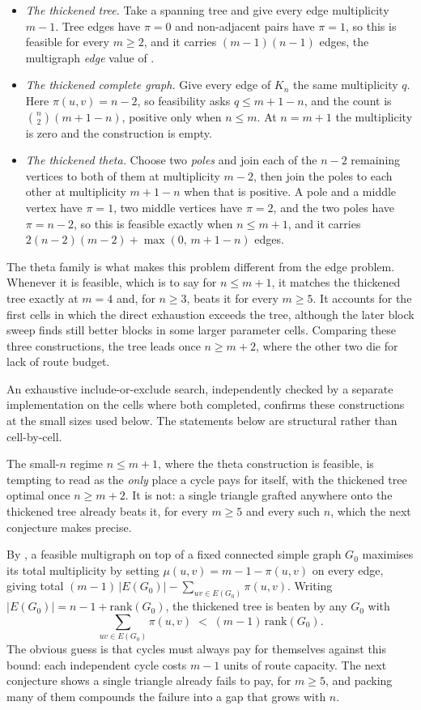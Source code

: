 \begin{itemize}
    \item \emph{The thickened tree.} Take a spanning tree and give every edge multiplicity $m-1$. Tree edges have $\pi = 0$ and non-adjacent pairs have $\pi = 1$, so this is feasible for every $m \ge 2$, and it carries $(m-1)(n-1)$ edges, the multigraph \emph{edge} value of .
    \item \emph{The thickened complete graph.} Give every edge of $K_n$ the same multiplicity $q$. Here $\pi(u,v) = n-2$, so feasibility asks $q \le m+1-n$, and the count is $\binom{n}{2}(m+1-n)$, positive only when $n \le m$. At $n=m+1$ the multiplicity is zero and the construction is empty.
    \item \emph{The thickened theta.} Choose two \emph{poles} and join each of the $n-2$ remaining vertices to both of them at multiplicity $m-2$, then join the poles to each other at multiplicity $m+1-n$ when that is positive. A pole and a middle vertex have $\pi = 1$, two middle vertices have $\pi = 2$, and the two poles have $\pi = n-2$, so this is feasible exactly when $n \le m+1$, and it carries $2(n-2)(m-2) + \max(0,\, m+1-n)$ edges.
\end{itemize}

The theta family is what makes this problem different from the edge problem. Whenever it is feasible, which is to say for $n \le m+1$, it matches the thickened tree exactly at $m = 4$ and, for $n\ge3$, beats it for every $m \ge 5$. It accounts for the first cells in which the direct exhaustion exceeds the tree, although the later block sweep finds still better blocks in some larger parameter cells. Comparing these three constructions, the tree leads once $n \ge m+2$, where the other two die for lack of route budget.

An exhaustive include-or-exclude search, independently checked by a separate
implementation on the cells where both completed, confirms these constructions
at the small sizes used below. The statements below are structural rather than
cell-by-cell.

The small-$n$ regime $n \le m+1$, where the theta construction is feasible, is tempting to read as the \emph{only} place a cycle pays for itself, with the thickened tree optimal once $n \ge m+2$. It is not: a single triangle grafted anywhere onto the thickened tree already beats it, for every $m \ge 5$ and every such $n$, which the next conjecture makes precise.

By , a feasible multigraph on top of a fixed connected simple graph $G_0$ maximises its total multiplicity by setting $\mu(u,v) = m-1-\pi(u,v)$ on every edge, giving total $(m-1)\,|E(G_0)| - \sum_{uv \in E(G_0)} \pi(u,v)$. Writing $|E(G_0)| = n - 1 + \mathrm{rank}(G_0)$, the thickened tree is beaten by any $G_0$ with
\[
    \sum_{uv \in E(G_0)} \pi(u,v) \;<\; (m-1)\,\mathrm{rank}(G_0).
\]
The obvious guess is that cycles must always pay for themselves against this bound: each independent cycle costs $m-1$ units of route capacity. The next conjecture shows a single triangle already fails to pay, for $m \ge 5$, and packing many of them compounds the failure into a gap that grows with $n$.


